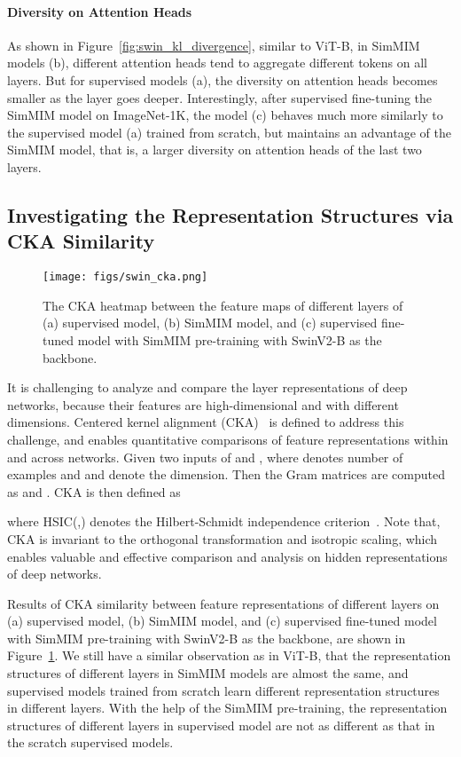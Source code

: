 \documentclass{article}
\begin{document}
\paragraph{Diversity on Attention Heads} As shown in Figure~\ref{fig:swin_kl_divergence}, similar to ViT-B, in SimMIM models (b), different attention heads tend to aggregate different tokens on all layers. But for supervised models (a), the diversity on attention heads becomes smaller as the layer goes deeper. Interestingly, after supervised fine-tuning the SimMIM model on ImageNet-1K, the model (c) behaves much more similarly to the supervised model (a) trained from scratch, but maintains an advantage of the SimMIM model, that is, a larger diversity on attention heads of the last two layers.

\subsection{Investigating the Representation Structures via CKA Similarity}


\begin{figure}[h]
    \centering
    \texttt{[image: figs/swin\_cka.png]}
  \vspace{-2.0em}
    \caption{The CKA heatmap between the feature maps of different layers of (a) supervised model, (b) SimMIM model, and (c) supervised fine-tuned model with SimMIM pre-training with SwinV2-B as the backbone.}
    \label{fig:swin_cka}
\end{figure}

It is challenging to analyze and compare the layer representations of deep networks, because their features are high-dimensional and with different dimensions. Centered kernel alignment (CKA)~\cite{cka} is defined to address this challenge, and enables quantitative comparisons of feature representations within and across networks. Given two inputs of  and , where  denotes number of examples and  and  denote the dimension. Then the Gram matrices are computed as  and . CKA is then defined as

where HSIC(,) denotes the Hilbert-Schmidt independence criterion~\cite{hsic}. Note that, CKA is invariant to the orthogonal transformation and isotropic scaling, which enables valuable and effective comparison and analysis on hidden representations of deep networks. 

Results of CKA similarity between feature representations of different layers on (a) supervised model, (b) SimMIM model, and (c) supervised fine-tuned model with SimMIM pre-training with SwinV2-B as the backbone, are shown in Figure~\ref{fig:swin_cka}. We still have a similar observation as in ViT-B, that the representation structures of different layers in SimMIM models are almost the same, and supervised models trained from scratch learn different representation structures in different layers. With the help of the SimMIM pre-training, the representation structures of different layers in supervised model are not as different as that in the scratch supervised models.
\end{document}
